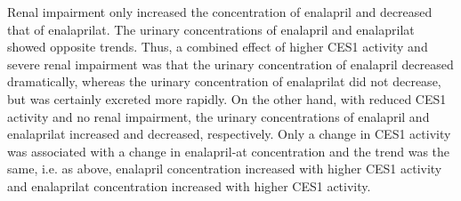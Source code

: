 \documentclass[pharmaceutics,article,submit,pdftex,moreauthors]{Definitions/mdpi}
\begin{document}
Renal impairment only increased the concentration of enalapril and decreased that of enalaprilat. The urinary concentrations of ena\-lapril and enalaprilat showed opposite trends. Thus, a combined effect of higher CES1 activity and severe renal impairment was that the urinary concentration of enalapril decreased dramatically, whereas the urinary concentration of enalaprilat did not decrease, but was certainly excreted more rapidly. On the other hand, with reduced CES1 activity and no renal impairment, the urinary concentrations of enalapril and enalaprilat increased and decreased, respectively. Only a change in CES1 activity was associated with a change in enalapril-at concentration and the trend was the same, i.e. as above, enalapril concentration increased with higher CES1 activity and enalaprilat concentration increased with higher CES1 activity.


\end{document}
